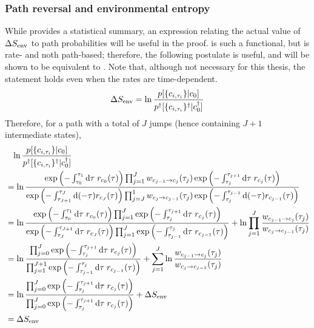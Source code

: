 \subsubsection{Path reversal and environmental entropy}

While  provides a statistical summary, an expression relating the actual value of \(\Delta S_\text{env}\) to path probabilities will be useful in the proof.  is such a functional, but is rate- and noth path-based; therefore, the following postulate is useful, and will be shown to be equivalent to . Note that, although not necessary for this thesis, the statement holds even when the rates are time-dependent.
%
\begin{equation}
	\label{eqn:SEnv path functional}
	\Delta S_\text{env}
	= \ln\frac{p[\{c_{i,\tau_i}\}|c_0]}{p^\dagger[\{c_{i,\tau_i}\}^\dagger|c^\dagger_0]}
\end{equation}
%
Therefore, for a path with a total of \(J\) jumps (hence containing \(J+1\) intermediate states),
%
\begin{align*}
	&\phantom{=}
		\ln\frac{p[\{c_{i,\tau_i}\} | c_0]}{p^\dagger[\{c_{i,\tau_i}\}^\dagger | c_0^\dagger]}
	\\
	&=
		\ln\frac{
			\operatorname{exp}\left(-\int_{\tau_0}^{\tau_1}\mathrm{d}\tau\;r_{c_0}(\tau)\right)
			\prod_{j=1}^J
				w_{c_{j-1} \to c_j}(\tau_j)
				\operatorname{exp}\left(-\int_{\tau_j}^{\tau_{j+1}}\mathrm{d}\tau\;r_{c_j}(\tau)\right)
		}{
			\operatorname{exp}\left(-\int_{\tau_{J+1}}^{\tau_J}\mathrm{d}(-\tau)r_{c_J}(\tau)\right)
			\prod_{j=J}^1
				w_{c_j\to c_{j-1}}(\tau_j)
				\operatorname{exp}\left(-\int_{\tau_j}^{\tau_{j-1}}\mathrm{d}(-\tau)r_{c_{j-1}}(\tau)\right)
		}
	\\
	&=
		\ln\frac{
			\operatorname{exp}\left(-\int_{\tau_0}^{\tau_1}\mathrm{d}\tau\;r_{c_0}(\tau)\right)
			\prod_{j=1}^J
				\operatorname{exp}\left(-\int_{\tau_j}^{\tau_{j+1}}\mathrm{d}\tau\;r_{c_j}(\tau)\right)
		}{
			\operatorname{exp}\left(-\int_{\tau_J}^{\tau_{J+1}}\mathrm{d}\tau\;r_{c_J}(\tau)\right)
			\prod_{j=1}^J
				\operatorname{exp}\left(-\int_{\tau_{j-1}}^{\tau_j}\mathrm{d}\tau\;r_{c_{j-1}}(\tau)\right)
		}
		+ \ln\prod_{j=1}^J\frac{w_{c_{j-1}\to c_j}(\tau_j)}{w_{c_j\to c_{j-1}}(\tau_j)}
	\\
	&=
		\ln\frac{
			\prod_{j=0}^J
				\operatorname{exp}\left(-\int_{\tau_j}^{\tau_{j+1}}\mathrm{d}\tau\;r_{c_j}(\tau)\right)
		}{
			\prod_{j=1}^{J+1}
				\operatorname{exp}\left(-\int_{\tau_{j-1}}^{\tau_j}\mathrm{d}\tau\;r_{c_{j-1}}(\tau)\right)
		}
		+ \sum_{j=1}^J\ln\frac{w_{c_{j-1}\to c_j}(\tau_j)}{w_{c_j\to c_{j-1}}(\tau_j)}
	\\
	&=
		\ln\frac{
			\prod_{j=0}^J
				\operatorname{exp}\left(-\int_{\tau_j}^{\tau_{j+1}}\mathrm{d}\tau\;r_{c_j}(\tau)\right)
		}{
			\prod_{j=0}^J
				\operatorname{exp}\left(-\int_{\tau_j}^{\tau_{j+1}}\mathrm{d}\tau\;r_{c_j}(\tau)\right)
		}
		+ \Delta S_\text{env}
	\\
	&=
		\Delta S_\text{env}
\end{align*}
